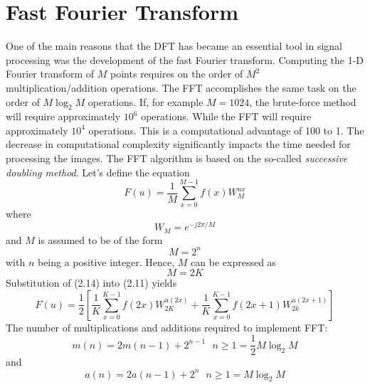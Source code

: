 \section{Fast Fourier Transform}
One of the main reasons that the DFT has became an essential tool in signal processing was the development of the fast Fourier transform. Computing the 1-D Fourier transform of $M$ points requires on the order of $M^2$ multiplication/addition operations. The FFT accomplishes the same task on the order of $M \log_2 M $ operations. If, for example $M = 1024$, the brute-force method will require approximately $10^6$ operations. While the FFT will require approximately $10^4$ operations. This is a computational advantage of 100 to 1. The decrease in computational complexity significantly impacts the time needed for processing the images. The FFT algorithm is based on the so-called \textit{successive doubling method}. Let's define the equation
\begin{equation}
F(u) = \frac{1}{M} \sum_{x = 0}^{M - 1}f(x)W_M^{ux}
\end{equation}
where 
\begin{equation}
W_M = e^{-j2\pi / M}
\end{equation}
and $M$ is assumed to be of the form
\begin{equation}
M = 2^n
\end{equation}
with $n$ being a positive integer. Hence, $M$ can be expressed as 
\begin{equation}
M = 2K
\end{equation}
Substitution of (2.14) into (2.11) yields
\begin{equation}
F(u) = \frac{1}{2}[\frac{1}{K}\sum_{x = 0}^{K - 1} f(2x)W^{u(2x)}_{2K} + \frac{1}{K}\sum_{x = 0}^{K - 1}f(2x + 1)W_{2k}^{u(2x + 1)}]
\end{equation}
The number of multiplications and additions required to implement FFT:
\begin{equation}
m(n) = 2m(n - 1) + 2^{n - 1} \ \ \  n \geq 1 = \frac{1}{2} M \log_2 M
\end{equation}
and
\begin{equation}
a(n) = 2a(n - 1) + 2^n  \ \ \ n \geq 1 = M \log_2 M
\end{equation}